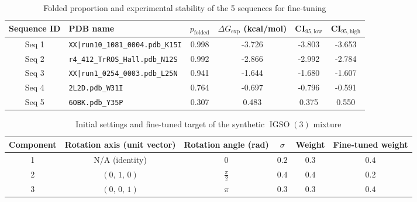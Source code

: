 \documentclass{article}
\theoremstyle{plain}
\theoremstyle{definition}
\theoremstyle{remark}
\DeclareMathOperator{\IGSO}{IGSO}
\begin{document}
\begin{table}[!ht]
\centering
\caption{Folded proportion and experimental stability of the 5 sequences for fine-tuning}
\label{tab:protein_summary}
\begin{tabular}{clcccc}
\toprule
Sequence ID & PDB name & $p_{\text{folded}}$ & $\Delta G_{\text{exp}}$ (kcal/mol) & CI$_{95,\text{low}}$ & CI$_{95,\text{high}}$ \\
\midrule
Seq 1 & \texttt{XX|run10\_1081\_0004.pdb\_K15I} & 0.998 & -3.726 & -3.803 & -3.653 \\
Seq 2 & \texttt{r4\_412\_TrROS\_Hall.pdb\_N12S} & 0.992 & -2.866 & -2.992 & -2.784\\
Seq 3 & \texttt{XX|run1\_0254\_0003.pdb\_L25N}   & 0.941 & -1.644 & -1.680 & -1.607 \\
Seq 4 & \texttt{2L2D.pdb\_W31I}                  & 0.764 & -0.697 & -0.796 & -0.591 \\
Seq 5 & \texttt{6OBK.pdb\_Y35P}                  & 0.307 &  0.483 & 0.375 & 0.550 \\
\bottomrule
\end{tabular}
\end{table}


\begin{table}[!ht]
\centering
\caption{Initial settings and fine-tuned target of the synthetic $\IGSO(3)$ mixture}
\label{tab:igso3_mixture_settings}
\begin{tabular}{cccccc}
\toprule
Component & Rotation axis (unit vector) & Rotation angle (rad) & $\sigma$ & Weight & Fine-tuned weight \\
\midrule
1 & N/A (identity)      & $0$               & $0.2$ & $0.3$ & $0.4$ \\
2 & $(0,\,1,\,0)$       & $\frac{\pi}{2}$  & $0.4$ & $0.4$ & $0.2$ \\
3 & $(0,\,0,\,1)$       & $\pi$             & $0.3$ & $0.3$ & $0.4$ \\
\bottomrule
\end{tabular}
\end{table}


\end{document}

